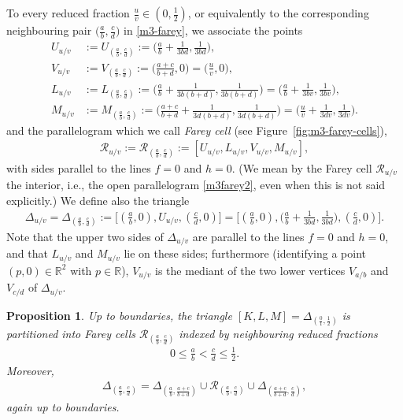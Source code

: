 \documentclass[11pt,reqno,tbtags,a4paper]{amsart}
\numberwithin{equation}{section}
\renewcommand\le{\leq}
\renewcommand\leq{\leqslant}
\theoremstyle{plain}%
\newtheorem{proposition}[theorem]{Proposition}
\theoremstyle{definition}
\theoremstyle{remark}
\newcommand{\refFig}[1]{Figure~\ref{#1}}
\newcommand\bigpar[1]{\bigl(#1\bigr)}
\newcommand\bigsqpar[1]{\bigl[#1\bigr]}
\newcommand\bbR{\mathbb R}
\newcommand\gD{\Delta}
\newcommand\cR{{\mathcal R}}
\newcommand\uv{_{u/v}}
\newcommand\0{{\boldsymbol 0}}
\newcommand\1{{\boldsymbol 1}}
\begin{document}
To every reduced fraction $\frac uv\in(0,\tfrac12)$, or equivalently to
the corresponding neighbouring pair $\bigl(\frac ab,\frac cd\bigr)$ 
in \eqref{m3-farey},
we associate the 
points
\begin{align}\label{m3-fcu}
 U_{u/v}&:=U_{(\frac ab,\frac cd)}
:=\bigl(\tfrac ab+\tfrac1{3bd},\tfrac1{3bd}\bigr),
\\\label{m3-fcv}
 V_{u/v}&:=V_{(\frac ab,\frac cd)}
:=\bigl(\tfrac{a+c}{b+d},0\bigr)=\bigpar{\tfrac uv,0},
\\\label{m3-fcl}
 L_{u/v}&:=L_{(\frac ab,\frac cd)}
:=\bigl(\tfrac ab+\tfrac1{3b(b+d)},\tfrac1{3b(b+d)}\bigr)
=\bigl(\tfrac ab+\tfrac1{3bv},\tfrac1{3bv}\bigr)
,\\\label{m3-fcm}
 M_{u/v}&:=M_{(\frac ab,\frac cd)}
:=\bigl(\tfrac{a+c}{b+d}+\tfrac1{3d(b+d)},\tfrac1{3d(b+d)}\bigr)
=\bigl(\tfrac{u}{v}+\tfrac1{3dv},\tfrac1{3dv}\bigr)
.\end{align}
and the parallelogram 
which we call \emph{Farey cell}
(see \refFig{fig:m3-farey-cells}),
\begin{align}\label{m3farey2}
\cR_{u/v}:=\cR_{(\frac ab,\frac cd)}
:=[U_{u/v},L_{u/v},V_{u/v},M_{u/v}],
%
%
\end{align}
with sides  parallel to the lines $f=0$ and $h=0$.
(We mean by the Farey cell $\cR\uv$ the interior, i.e.,
the open parallelogram \eqref{m3farey2},
even when this is not said explicitly.)
We define also
the triangle 
\begin{align}\label{m3farey0}
\gD_{u/v}=\Delta_{(\frac ab,\frac cd)}
:=\bigsqpar{(\tfrac ab,0),U_{u/v},(\tfrac cd,0)}
=
\bigsqpar{(\tfrac ab,0),\bigl(\tfrac ab+\tfrac1{3bd},\tfrac1{3bd}\bigr),(\tfrac cd,0)}.
\end{align}
Note that the upper two sides of $\gD_{u/v}$ are 
parallel to the lines 
$f=0$ and $h=0$, and that $L_{u/v}$ and $M_{u/v}$ lie on these sides;
furthermore (identifying a point $(p,0)\in\bbR^2$ with $p\in\bbR$), 
$V_{u/v}$ is the mediant of the two lower vertices 
$V_{a/b}$ and $V_{c/d}$ of $\gD_{u/v}$.

\begin{proposition}\label{Pm3-farey-partition}
Up to boundaries, the triangle $[K,L,M]=\gD_{(\frac01,\frac12)}$ 
is partitioned into Farey cells
$\cR_{(\frac ab,\frac cd)}$ indexed by neighbouring reduced fractions
\begin{align}
0\le \frac ab<\frac cd\le \frac12.
\end{align}
Moreover,
\begin{align}\label{m3farey1}
\Delta_{(\frac ab,\frac cd)}
=
\Delta_{(\frac ab,\frac{a+c}{b+d})}
\cup \cR_{(\frac ab,\frac cd)}
\cup
\Delta_{(\frac{a+c}{b+d},\frac cd)},
\end{align}
again up to boundaries.
\end{proposition}
\end{document}

